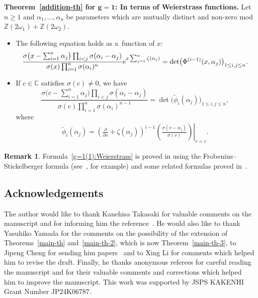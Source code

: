 \documentclass[pdftex]{sigma}
\numberwithin{equation}{section}
\theoremstyle{definition}
\newtheorem{Remark}[Theorem]{Remark}
\begin{document}
{\bf Theorem~\ref{addition-th} for $\boldsymbol{ g=1}$: In terms of Weierstrass functions.}
Let $n\geq 1$ and $\alpha_1,\dots ,\alpha_n$ be parameters which are mutually distinct and non-zero
mod $\mathbb{Z}(2\omega_1)+\mathbb{Z}(2\omega_2)$.
\begin{itemize}
\item[(1)] The following equation holds as a~function of $x$:
\begin{gather}
\frac{\sigma\bigl(x-\sum_{i=1}^n \alpha_j\bigr)\prod_{i<j}\sigma(\alpha_i-\alpha_j)}
{\sigma(x)\prod_{i=1}^n\sigma(\alpha_i)^n}
{\rm e}^{x\sum_{j=1}^n\zeta(\alpha_j)}
=
\det\bigl(\Phi^{(i-1)}(x,\alpha_j)\bigr)_{1\leq i,j\leq n}.
\label{g=1(1):Weierstrass}
\end{gather}

\item[(2)] If $c\in\mathbb{C}$ satisfies $\sigma(c)\neq 0$, we have
\[%
\frac{\sigma\bigl(c-\sum_{i=1}^n \alpha_j\bigr)\prod_{i<j}\sigma(\alpha_i-\alpha_j)}
{\sigma(c)\prod_{i=1}^n\sigma(\alpha_i)^{n-1}}
=
\det\bigl(
\tilde{\phi}_{i}(\alpha_j)
\bigr)_{1\leq i,j\leq n},
\]
where
\begin{gather*}
\tilde{\phi}_{i}(\alpha_j)=\left(\frac{\partial}{\partial v}+\zeta(\alpha_j)\right)^{i-1}
\left.\left(\frac{\sigma(v-\alpha_j)}{\sigma(v)}\right)\right|_{v=c}.
\end{gather*}
\end{itemize}

\begin{Remark} Formula~\eqref{g=1(1):Weierstrass} is proved in \cite[Lemma 3.1]{Li-Zhang2022}
using the Frobenius--Stickelberger formula (see~\cite{Whittaker-Watson1902}, for example) and some related formulas proved in~\cite{DN2018,NSZ2019}.
\end{Remark}


\subsection*{Acknowledgements}

The author would like to thank Kanehisa Takasaki for valuable comments on the manuscript and for informing him the reference~\cite{Zabrodin2025}. He would also like to thank Yasuhiko Yamada for the comments on the possibility of the extension of Theorems~\ref{main-th} and~\ref{main-th-2}, which is now Theorem~\ref{main-th-3}, to Jipeng Cheng for
sending him papers~\cite{He-Li-Cheng2002,Wang-Chen-Cheng2025} and
to Xing Li for comments which helped him to revise the draft.
Finally, he thanks anonymous referees for careful reading the manuscript and for their valuable comments and corrections which helped him to improve the manuscript.
This work was supported by JSPS KAKENHI Grant Number JP24K06787.
\end{document}

